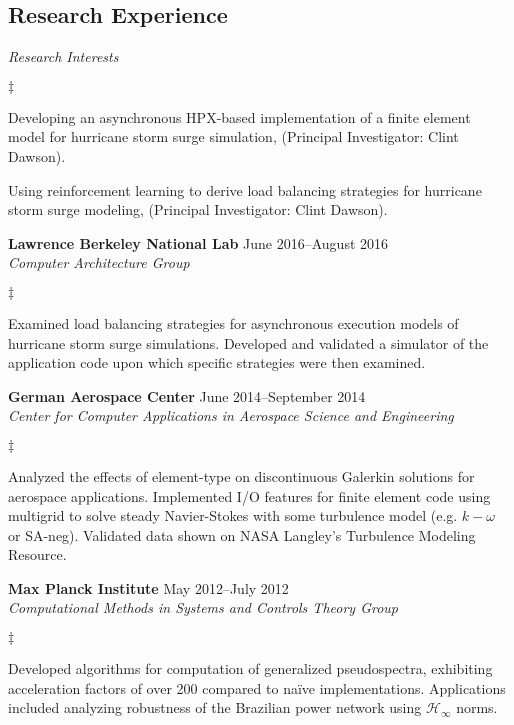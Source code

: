 \documentclass[margin,line]{res}
\newenvironment{list2}{
  \begin{list}{$\ddagger$}{%
      \setlength{\itemsep}{0in}
      \setlength{\parsep}{0in} \setlength{\parskip}{0in}
      \setlength{\topsep}{0in} \setlength{\partopsep}{0in}
      \setlength{\leftmargin}{0.2in}}}{\end{list}}
\begin{document}
\begin{resume}
\section{\sc Research Experience}
\textit{Research Interests}
\vspace{0.05in}
\begin{list2}
\item Developing an asynchronous HPX-based implementation of a finite element model for hurricane storm surge simulation, 	(Principal Investigator: Clint Dawson).
\item Using reinforcement learning to derive load balancing strategies for hurricane storm surge modeling, 	(Principal Investigator: Clint Dawson).

\end{list2}

\textbf{Lawrence Berkeley National Lab} \hfill June 2016--August 2016\\
\textit{Computer Architecture Group} 
\vspace{0.05in}
\begin{list2}
\item[] Examined load balancing strategies for asynchronous execution models of hurricane storm surge simulations. Developed and validated a simulator of the application code upon which specific strategies were then examined.
\end{list2} 

\textbf{German Aerospace Center} \hfill June 2014--September 2014\\
\textit{Center for Computer Applications in Aerospace Science and Engineering}
\vspace{0.05in}
\begin{list2}
\item[] Analyzed the effects of element-type on discontinuous Galerkin solutions for aerospace applications. Implemented I/O features for finite element code using multigrid to solve steady Navier-Stokes with some turbulence model (e.g. $k- \omega$ or SA-neg). Validated data shown on NASA Langley's Turbulence Modeling Resource.
\end{list2}

\textbf{ Max Planck Institute} \hfill May 2012--July 2012\\
\textit{Computational Methods in Systems and Controls Theory Group}
\vspace{0.05in}
\begin{list2}
\item[] Developed algorithms for computation of generalized pseudospectra, exhibiting acceleration factors of over 200 compared to na\"ive implementations. Applications included analyzing robustness of the Brazilian power network using $\mathcal{H}_{\infty}$ norms.
\end{list2} 


\end{resume}
\end{document}
